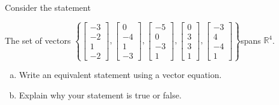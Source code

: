 
\begin{exerciseStatement}


Consider the statement 
\begin{center}\begin{minipage}{0.8\textwidth}
 The set of vectors \( \left\{ \left[\begin{array}{c}
-3 \\
-2 \\
1 \\
-2
\end{array}\right] , \left[\begin{array}{c}
0 \\
-4 \\
1 \\
-3
\end{array}\right] , \left[\begin{array}{c}
-5 \\
0 \\
-3 \\
1
\end{array}\right] , \left[\begin{array}{c}
0 \\
3 \\
3 \\
1
\end{array}\right] , \left[\begin{array}{c}
-3 \\
4 \\
-4 \\
1
\end{array}\right] \right\} \)spans \(\mathbb{R}^4\). 
\end{minipage}\end{center}
    


\begin{enumerate}[(a)]
\item  Write an equivalent statement using a vector equation.
\item  Explain why your statement is true or false.
\end{enumerate}
    
\end{exerciseStatement}
    
